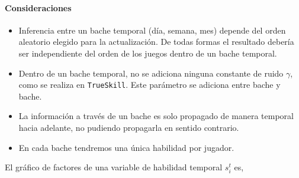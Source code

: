 \documentclass[11pt,twoside, spanish]{report} %
\begin{document}
\paragraph{Consideraciones}
\begin{itemize}
	\item Inferencia entre un bache temporal (d\'ia, semana, mes) depende del orden aleatorio elegido para la actualizaci\'on. De todas formas el resultado deber\'ia ser independiente del orden de los juegos dentro de un bache temporal.
	\item Dentro de un bache temporal, no se adiciona ninguna constante de ruido $\gamma$, como se realiza en \texttt{TrueSkill}. 
	Este par\'ametro se adiciona entre bache y bache.
	\item La informaci\'on a trav\'es de un bache es solo propagado de manera temporal hacia adelante, no pudiendo propagarla en sentido contrario.
	\item En cada bache tendremos una \'unica habilidad por jugador.
\end{itemize}

El gr\'afico de factores de una variable de habilidad temporal $s_i^t$ es,
\end{document}
